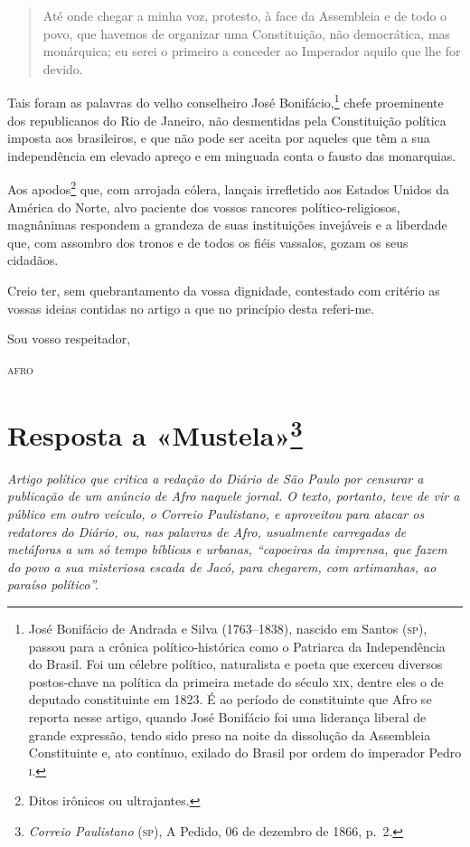 \begin{quote}
Até onde chegar a minha voz, protesto, à face da Assembleia e de todo o
povo, que havemos de organizar uma Constituição, não democrática, mas
monárquica; eu serei o primeiro a conceder ao Imperador aquilo que lhe
for devido.
\end{quote}

Tais foram as palavras do velho conselheiro José Bonifácio,\footnote{
  José Bonifácio de Andrada e Silva (1763--1838), nascido em Santos (\textsc{sp}),
  passou para a crônica político-histórica como o Patriarca da
  Independência do Brasil. Foi um célebre político, naturalista e poeta
  que exerceu diversos postos-chave na política da primeira metade do
  século \textsc{xix}, dentre eles o de deputado constituinte em 1823.\label{bonifacio} 
  É ao período de constituinte que Afro se reporta nesse artigo,
  quando José Bonifácio foi uma liderança liberal de grande expressão,
  tendo sido preso na noite da dissolução da Assembleia Constituinte e,
  ato contínuo, exilado do Brasil por ordem do imperador Pedro \textsc{i}.}
chefe proeminente dos republicanos do Rio de Janeiro, não desmentidas
pela Constituição política imposta aos brasileiros, e que não pode ser
aceita por aqueles que têm a sua independência em elevado apreço e em
minguada conta o fausto das monarquias.

Aos apodos\footnote{Ditos irônicos ou ultrajantes.} que, com arrojada
cólera, lançais irrefletido aos Estados Unidos da América do Norte, alvo
paciente dos vossos rancores político-religiosos, magnânimas respondem a
grandeza de suas instituições invejáveis e a liberdade que, com assombro
dos tronos e de todos os fiéis vassalos, gozam os seus cidadãos.

Creio ter, sem quebrantamento da vossa dignidade, contestado com
critério as vossas ideias contidas no artigo a que no princípio desta
referi-me.

\begin{flushright}
Sou vosso respeitador,

\textsc{afro}
\end{flushright}

\chapter{Resposta a «Mustela»\footnote{\emph{Correio Paulistano} (\textsc{sp}), A Pedido, 06 de dezembro de 1866, p.~2.}}

\begin{didascalia}\itshape
Artigo político que critica a redação do \textnormal{Diário de São Paulo} por
censurar a publicação de um anúncio de Afro naquele jornal. O texto,
portanto, teve de vir a público em outro veículo, o \textnormal{Correio
Paulistano}, e aproveitou para atacar os redatores do
\textnormal{Diário}, ou, nas palavras de Afro, usualmente carregadas de
metáforas a um só tempo bíblicas e urbanas, ``capoeiras da imprensa, que
fazem do povo a sua misteriosa escada de Jacó, para chegarem, com
artimanhas, ao paraíso político''.
\end{didascalia}



